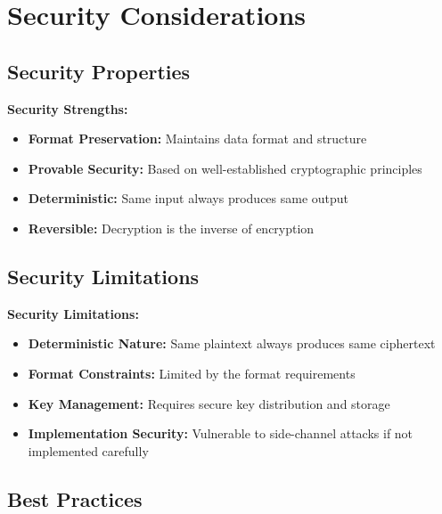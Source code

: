 \documentclass[11pt,a4paper]{article}
\begin{document}
\section{Security Considerations}

\subsection{Security Properties}

\begin{prosbox}
\textbf{Security Strengths:}
\begin{itemize}
    \item \textbf{Format Preservation:} Maintains data format and structure
    \item \textbf{Provable Security:} Based on well-established cryptographic principles
    \item \textbf{Deterministic:} Same input always produces same output
    \item \textbf{Reversible:} Decryption is the inverse of encryption
\end{itemize}
\end{prosbox}

\subsection{Security Limitations}

\begin{consbox}
\textbf{Security Limitations:}
\begin{itemize}
    \item \textbf{Deterministic Nature:} Same plaintext always produces same ciphertext
    \item \textbf{Format Constraints:} Limited by the format requirements
    \item \textbf{Key Management:} Requires secure key distribution and storage
    \item \textbf{Implementation Security:} Vulnerable to side-channel attacks if not implemented carefully
\end{itemize}
\end{consbox}

\subsection{Best Practices}
\end{document}
